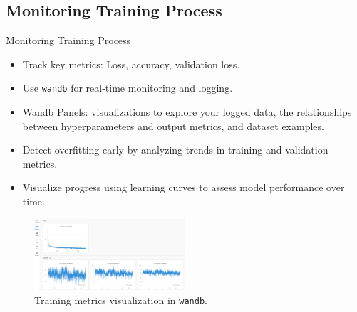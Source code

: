 \documentclass[serif, aspectratio=169]{beamer}
\begin{document}
\subsection{Monitoring Training Process}

\begin{frame}{Monitoring Training Process}
    \begin{itemize}
        \item Track key metrics: Loss, accuracy, validation loss.
        \item Use \texttt{wandb} for real-time monitoring and logging.
        \item Wandb Panels: visualizations to explore your logged data, the relationships between hyperparameters and output metrics, and dataset examples.
        \item Detect overfitting early by analyzing trends in training and validation metrics.
        \item Visualize progress using learning curves to assess model performance over time.
    \end{itemize}
    \begin{figure}
        \centering
        \includegraphics[width=0.5\textwidth]{pic/wandb.png}
        \caption{Training metrics visualization in \texttt{wandb}.}
        \label{fig:wandb}
    \end{figure}
\end{frame}



\end{document}
